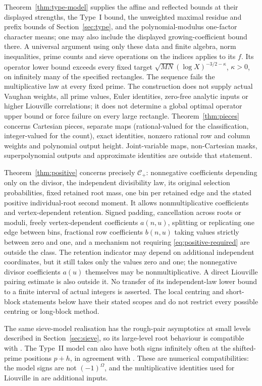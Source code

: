 \documentclass[11pt]{article}
\theoremstyle{definition}
\theoremstyle{remark}
\numberwithin{equation}{section}
\begin{document}
Theorem~\ref{thm:type-model} supplies the affine and reflected bounds at their displayed strengths,
the Type~I bound, the unweighted maximal residue and prefix bounds of Section~\ref{sec:type}, and the
polynomial-modulus one-factor character means; one may also include the displayed growing-coefficient
bound there. A universal argument using only these data and finite algebra, norm inequalities, prime
counts and sieve operations on the indices applies to its $f$. Its operator lower bound exceeds every
fixed target $\sqrt{MN}(\log X)^{-3/2-\kappa}$, $\kappa>0$, on infinitely many of the specified rectangles.
The sequence fails the multiplicative law at every fixed prime. The construction does not supply actual
Vaughan weights, all prime values, Euler identities, zero-free analytic inputs or higher Liouville
correlations; it does not determine a global optimal operator upper bound or force failure on every large
rectangle. Theorem~\ref{thm:pieces} concerns Cartesian pieces, separate maps (rational-valued for the classification,
integer-valued for the count), exact identities,
nonzero rational row and column weights and polynomial output height. Joint-variable maps, non-Cartesian
masks, superpolynomial outputs and approximate identities are outside that statement.

Theorem~\ref{thm:positive} concerns precisely $\mathcal C_+$: nonnegative coefficients depending only
on the divisor, the independent divisibility law, its original selection probabilities, fixed retained
root mass, one bin per retained edge and the stated positive individual-root second moment.
It allows nonmultiplicative coefficients and vertex-dependent retention. Signed padding, cancellation
across roots or moduli, freely vertex-dependent coefficients $a(n,u)$, splitting or replicating one edge
between bins, fractional row coefficients $b(n,u)$ taking values strictly between zero and one,
and a mechanism not requiring \eqref{eq:positive-required} are outside the class.
The retention indicator may depend on additional independent coordinates, but it still takes only the
values zero and one; the nonnegative divisor coefficients $a(u)$ themselves may be nonmultiplicative.
A direct Liouville pairing estimate is also outside it. No transfer of its independent-law lower bound
to a finite interval of actual integers is asserted. The local centring and short-block statements below
have their stated scopes and do not restrict every possible centring or long-block method.

The same sieve-model realisation has the rough-pair asymptotics at small levels described in
Section~\ref{sec:sieve}, so its large-level root behaviour is compatible with
\cite{Guo2026RoughPairsFixedDistance}.
The Type~II model can also have both signs infinitely often at the shifted-prime positions $p+h$, in
agreement with \cite{Guo2026ShiftedPrimeParity}.
These are numerical compatibilities: the model signs are not $(-1)^\Omega$, and the multiplicative
identities used for Liouville in
\cite{Guo2026RoughPairsFixedDistance,Guo2026RoughGoldbachParity,Guo2026ShiftedPrimeParity}
are additional inputs.
\end{document}
